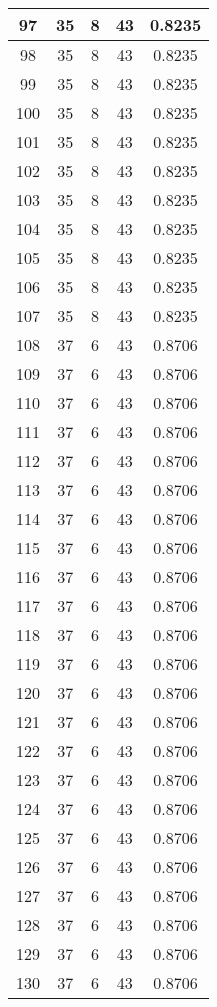 \documentclass[letterpaper, 12pt]{article}
\begin{document}
\begin{longtable}{|c|c|c|c|c|}
\hline
97 & 35 & 8 & 43 & 0.8235 \\
\hline
98 & 35 & 8 & 43 & 0.8235 \\
\hline
99 & 35 & 8 & 43 & 0.8235 \\
\hline
100 & 35 & 8 & 43 & 0.8235 \\
\hline
101 & 35 & 8 & 43 & 0.8235 \\
\hline
102 & 35 & 8 & 43 & 0.8235 \\
\hline
103 & 35 & 8 & 43 & 0.8235 \\
\hline
104 & 35 & 8 & 43 & 0.8235 \\
\hline
105 & 35 & 8 & 43 & 0.8235 \\
\hline
106 & 35 & 8 & 43 & 0.8235 \\
\hline
107 & 35 & 8 & 43 & 0.8235 \\
\hline
108 & 37 & 6 & 43 & 0.8706 \\
\hline
109 & 37 & 6 & 43 & 0.8706 \\
\hline
110 & 37 & 6 & 43 & 0.8706 \\
\hline
111 & 37 & 6 & 43 & 0.8706 \\
\hline
112 & 37 & 6 & 43 & 0.8706 \\
\hline
113 & 37 & 6 & 43 & 0.8706 \\
\hline
114 & 37 & 6 & 43 & 0.8706 \\
\hline
115 & 37 & 6 & 43 & 0.8706 \\
\hline
116 & 37 & 6 & 43 & 0.8706 \\
\hline
117 & 37 & 6 & 43 & 0.8706 \\
\hline
118 & 37 & 6 & 43 & 0.8706 \\
\hline
119 & 37 & 6 & 43 & 0.8706 \\
\hline
120 & 37 & 6 & 43 & 0.8706 \\
\hline
121 & 37 & 6 & 43 & 0.8706 \\
\hline
122 & 37 & 6 & 43 & 0.8706 \\
\hline
123 & 37 & 6 & 43 & 0.8706 \\
\hline
124 & 37 & 6 & 43 & 0.8706 \\
\hline
125 & 37 & 6 & 43 & 0.8706 \\
\hline
126 & 37 & 6 & 43 & 0.8706 \\
\hline
127 & 37 & 6 & 43 & 0.8706 \\
\hline
128 & 37 & 6 & 43 & 0.8706 \\
\hline
129 & 37 & 6 & 43 & 0.8706 \\
\hline
130 & 37 & 6 & 43 & 0.8706 \\

\end{longtable}
\end{document}
